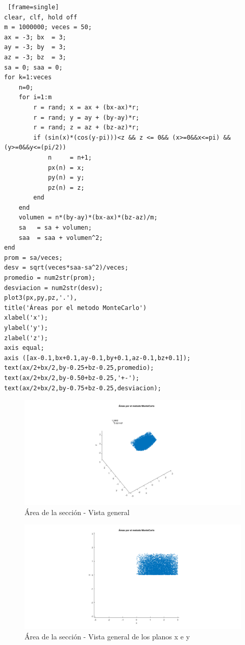 \documentclass{article}
\begin{document}
\begin{lstlisting} [frame=single]
clear, clf, hold off
m = 1000000; veces = 50;
ax = -3; bx  = 3;
ay = -3; by  = 3;
az = -3; bz  = 3; 
sa = 0; saa = 0;
for k=1:veces
    n=0;
    for i=1:m
        r = rand; x = ax + (bx-ax)*r;
        r = rand; y = ay + (by-ay)*r;
        r = rand; z = az + (bz-az)*r;
        if (sin(x)*(cos(y-pi)))<z && z <= 0&& (x>=0&&x<=pi) && (y>=0&&y<=(pi/2))
            n     = n+1;
            px(n) = x; 
            py(n) = y;
            pz(n) = z;
        end
    end
    volumen = n*(by-ay)*(bx-ax)*(bz-az)/m;
    sa   = sa + volumen;
    saa  = saa + volumen^2;
end
prom = sa/veces;
desv = sqrt(veces*saa-sa^2)/veces;
promedio = num2str(prom);
desviacion = num2str(desv);
plot3(px,py,pz,'.'),
title('Áreas por el metodo MonteCarlo') 
xlabel('x');
ylabel('y');
zlabel('z');
axis equal;
axis ([ax-0.1,bx+0.1,ay-0.1,by+0.1,az-0.1,bz+0.1]);
text(ax/2+bx/2,by-0.25+bz-0.25,promedio);
text(ax/2+bx/2,by-0.50+bz-0.25,'+-');
text(ax/2+bx/2,by-0.75+bz-0.25,desviacion);
\end{lstlisting}

\begin{figure}[H]
\centering
    \includegraphics[width=1\textwidth]{images/FIG07A.png}
    \caption{Área de la sección - Vista general}
\end{figure}

\begin{figure}[H]
\centering
    \includegraphics[width=1\textwidth]{images/FIG07B.png}
    \caption{Área de la sección - Vista general de los planos x e y}
\end{figure}
\end{document}
